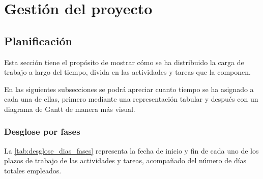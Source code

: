 \chapter{Gestión del proyecto}
\label{ch:gestion}
\section{Planificación}
Esta sección tiene el propósito de mostrar cómo se ha distribuido la carga de trabajo a largo del tiempo, divida en las actividades y tareas que la componen.

En las siguientes subsecciones se podrá apreciar cuanto tiempo se ha asignado a cada una de ellas, primero mediante una representación tabular y después con un diagrama de Gantt de manera más visual.

\subsection{Desglose por fases}\label{subsec:desglose_fases}
La \autoref{tab:desglose_dias_fases} representa la fecha de inicio y fin de cada uno de los plazos de trabajo de las actividades y tareas, acompañado del número de días totales empleados.

